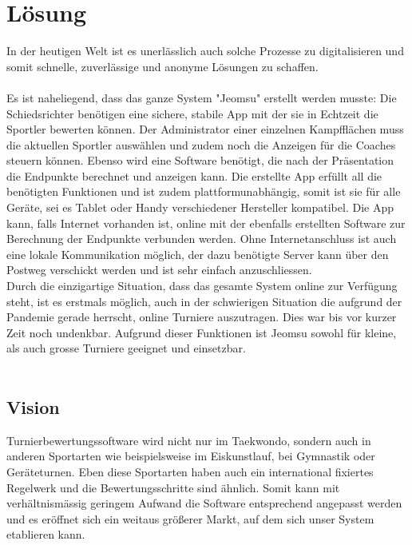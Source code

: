 \section{Lösung}
In der heutigen Welt ist es unerlässlich auch solche Prozesse zu digitalisieren und somit schnelle, zuverlässige und anonyme Lösungen zu schaffen.
\\\\
Es ist naheliegend, dass das ganze System "Jeomsu" erstellt werden musste:
Die Schiedsrichter benötigen eine sichere, stabile App mit der sie in Echtzeit die Sportler bewerten können.
Der Administrator einer einzelnen Kampfflächen muss die aktuellen Sportler auswählen und zudem noch die Anzeigen für die Coaches steuern können.
Ebenso wird eine Software benötigt, die nach der Präsentation die Endpunkte berechnet und anzeigen kann. 
Die erstellte App erfüllt all die benötigten Funktionen und ist zudem plattformunabhängig, somit ist sie für alle Geräte, sei es Tablet oder Handy verschiedener Hersteller kompatibel.
Die App kann, falls Internet vorhanden ist, online mit der ebenfalls erstellten Software zur Berechnung der Endpunkte verbunden werden.
Ohne Internetanschluss ist auch eine lokale Kommunikation möglich, der dazu benötigte Server kann über den Postweg verschickt werden und ist sehr einfach anzuschliessen.
\\
Durch die einzigartige Situation, dass das gesamte System online zur Verfügung steht, ist es erstmals möglich, auch in der schwierigen Situation die aufgrund der Pandemie gerade herrscht, online Turniere auszutragen.
Dies war bis vor kurzer Zeit noch undenkbar.
Aufgrund dieser Funktionen ist Jeomsu sowohl für kleine, als auch grosse Turniere geeignet und einsetzbar.
\\\\

\subsection{Vision}
Turnierbewertungssoftware wird nicht nur im Taekwondo, sondern auch in anderen Sportarten wie beispielsweise im Eiskunstlauf, bei Gymnastik oder Geräteturnen.
Eben diese Sportarten haben auch ein international fixiertes Regelwerk und die Bewertungsschritte sind ähnlich.
Somit kann mit verhältnismässig geringem Aufwand die Software entsprechend angepasst werden und es eröffnet sich ein weitaus größerer Markt, auf dem sich unser System etablieren kann.

